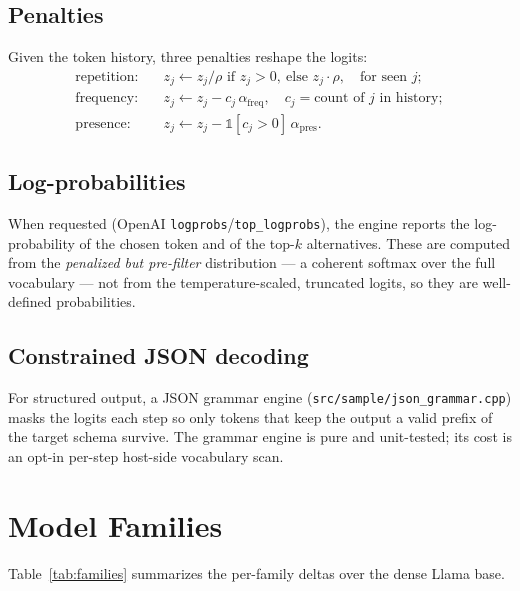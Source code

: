 \documentclass[11pt,a4paper]{report}
\newcommand{\code}[1]{\texttt{#1}}
\begin{document}
\section{Penalties}
Given the token history, three penalties reshape the logits:
\begin{align}
  \text{repetition:}\quad & z_j \leftarrow z_j/\rho \text{ if } z_j>0,\ \text{else } z_j\cdot\rho, \quad \text{for seen } j;\\
  \text{frequency:}\quad  & z_j \leftarrow z_j - c_j\,\alpha_{\text{freq}}, \quad c_j = \text{count of } j \text{ in history};\\
  \text{presence:}\quad   & z_j \leftarrow z_j - \mathbb{1}[c_j>0]\,\alpha_{\text{pres}}.
\end{align}

\section{Log-probabilities}
When requested (OpenAI \code{logprobs}/\code{top\_logprobs}), the engine reports the
log-probability of the chosen token and of the top-$k$ alternatives. These are
computed from the \emph{penalized but pre-filter} distribution --- a coherent softmax
over the full vocabulary --- not from the temperature-scaled, truncated logits, so
they are well-defined probabilities.

\section{Constrained JSON decoding}
For structured output, a JSON grammar engine (\code{src/sample/json\_grammar.cpp})
masks the logits each step so only tokens that keep the output a valid prefix of the
target schema survive. The grammar engine is pure and unit-tested; its cost is an
opt-in per-step host-side vocabulary scan.

\chapter{Model Families}
\label{ch:families}

Table~\ref{tab:families} summarizes the per-family deltas over the dense Llama base.
\end{document}

